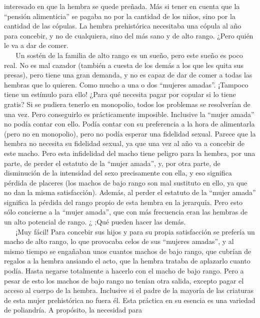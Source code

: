 interesado en que la hembra se quede preñada. Más si tener en cuenta que
la ``pensión alimenticia'' se pagaba no por la cantidad de los niños,
sino por la cantidad de las cópulas. La hembra prehistórica necesitaba
una cópula al año para concebir, y no de cualquiera, sino del más sano y
de alto rango. ¿Pero quién le va a dar de comer.\\
\hspace*{0.333em} ~ ~ Un sostén de la familia de alto rango es un sueño,
pero este sueño es poco real. No es mal cazador (también a cuesta de los
demás a los que les quita sus presas), pero tiene una gran demanda, y no
es capaz de dar de comer a todas las hembras que lo quieren. Como mucho
a una o dos ``mujeres amadas''. ¡Tampoco tiene un estímulo para ello!
¿Para qué necesita pagar por copular si lo tiene gratis? Si se pudiera
tenerlo en monopolio, todos los problemas se resolverían de una vez.
Pero conseguirlo es prácticamente imposible. Inclusive la ``mujer
amada'' no podía contar con ello. Podía contar con su preferencia a la
hora de alimentarla (pero no en monopolio), pero no podía esperar una
fidelidad sexual. Parece que la hembra no necesita su fidelidad sexual,
ya que una vez al año va a concebir de este macho. Pero esta infidelidad
del macho tiene peligro para la hembra, por una parte, de perder el
estatuto de la ``mujer amada'', y, por otra parte, de disminución de la
intensidad del sexo precisamente con ella, y eso significa pérdida de
placeres (los machos de bajo rango son mal sustituto en ello, ya que no
dan la misma satisfacción). Además, al perder el estatuto de la ``mujer
amada'' significa la pérdida del rango propio de esta hembra en la
jerarquía. Pero esto sólo concierne a la ``mujer amada'', que con más
frecuencia eran las hembras de un alto potencial de rango. ¿ ;Qué pueden
hacer las demás.\\
\hspace*{0.333em} ~ ~ ¡Muy fácil! Para concebir sus hijos y para su
propia satisfacción se prefería un macho de alto rango, lo que provocaba
celos de sus ``mujeres amadas'', y al mismo tiempo se engañaban unos
cuantos machos de bajo rango, que cubrían de regalos a la hembra
ansiando el acto, que la hembra trataba de aplazarlo cuanto podía. Hasta
negarse totalmente a hacerlo con el macho de bajo rango. Pero a pesar de
esto los machos de bajo rango no tenían otra salida, excepto pagar el
acceso al cuerpo de la hembra. Inclusive si el padre de la mayoría de
las criaturas de esta mujer prehistórica no fuera él. Esta práctica en
su esencia es una variedad de poliandría. A propósito, la necesidad para
